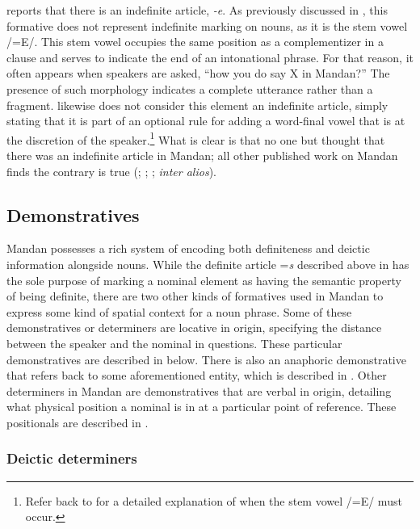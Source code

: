 \citet[26]{kennard1936} reports that there is an indefinite article, \textit{-e}. As previously discussed in , this formative does not represent indefinite marking on nouns, as it is the stem vowel /=E/. This stem vowel occupies the same position as a complementizer in a clause and serves to indicate the end of an intonational phrase. For that reason, it often appears when speakers are asked, ``how you do say X in Mandan?'' The presence of such morphology indicates a complete utterance rather than a fragment. \citet[39]{hollow1970} likewise does not consider this element an indefinite article, simply stating that it is part of an optional rule for adding a word-final vowel that is at the discretion of the speaker.\footnote{Refer back to  for a detailed explanation of when the stem vowel /=E/ must occur.} What is clear is that no one but \citeauthor{kennard1936} thought that there was an indefinite article in Mandan; all other published work on Mandan finds the contrary is true (\citealt{hollow1970}; \citealt{mixco1997a}; \citealt{kasak2019}; \textit{inter alios}).

\subsection{Demonstratives}\label{SubSecDemonstratives}

Mandan possesses a rich system of encoding both definiteness and deictic information alongside nouns. While the definite article =\textit{s} described above in  has the sole purpose of marking a nominal element as having the semantic property of being definite, there are two other kinds of formatives used in Mandan to express some kind of spatial context for a noun phrase. Some of these demonstratives or determiners are locative in origin, specifying the distance between the speaker and the nominal in questions. These particular demonstratives are described in  below. There is also an anaphoric demonstrative that refers back to some aforementioned entity, which is described in . Other determiners in Mandan are demonstratives that are verbal in origin, detailing what physical position a nominal is in at a particular point of reference. These positionals are described in .

\subsubsection{Deictic determiners}\label{SubSubSecDeicticDeterminers}

